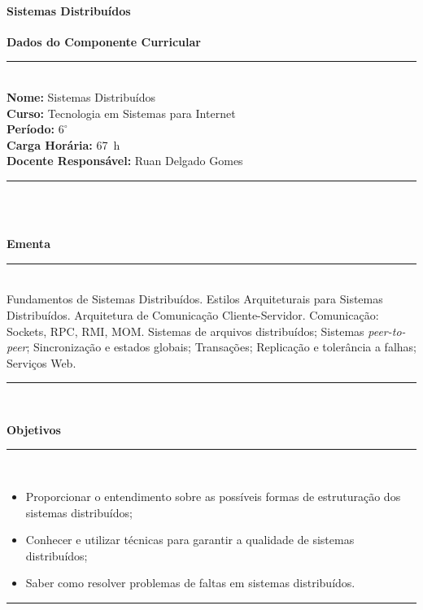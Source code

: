 \paragraph{Sistemas Distribu\'idos}

\begin{center}\textbf{Dados do Componente Curricular}\end{center}
\noindent\rule{16.2cm}{0.4pt}
\\
\textbf{Nome:} Sistemas Distribuídos
\\ 
\textbf{Curso:} Tecnologia em Sistemas para Internet
\\ 
\textbf{Período:} $6^{\circ}$
\\ 
\textbf{Carga Horária:} 67~h
\\ 
\textbf{Docente Responsável:} Ruan Delgado Gomes
\\ 
\noindent\rule{16.2cm}{0.4pt}\\
\\
\begin{center}\textbf{Ementa}\end{center}
\noindent\rule{16.2cm}{0.4pt}
\\
Fundamentos de Sistemas Distribuídos. Estilos Arquiteturais para Sistemas Distribuídos. Arquitetura de Comunicação Cliente-Servidor. Comunicação: Sockets, RPC, RMI, MOM. Sistemas de arquivos distribuídos; Sistemas \textit{peer-to-peer}; Sincronização e estados globais; Transações; Replicação e tolerância a falhas; Serviços Web.\\ 
\noindent\rule{16.2cm}{0.4pt}\\
\begin{center}\textbf{Objetivos}\end{center}
\noindent\rule{16.2cm}{0.4pt}
\\
\begin{itemize}
\item Proporcionar o entendimento sobre as possíveis formas de estruturação dos sistemas distribuídos;
\item Conhecer e utilizar técnicas para garantir a qualidade de sistemas distribuídos;
\item Saber como resolver problemas de faltas em sistemas distribuídos.
\end{itemize} 
\noindent\rule{16.2cm}{0.4pt}\\
\\

